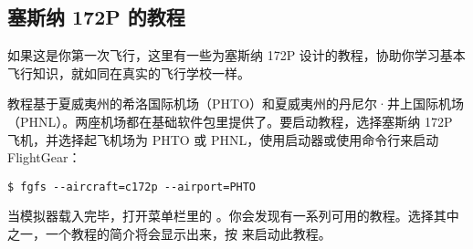 \ifchinese
\subsection{塞斯纳 172P 的教程}

如果这是你第一次飞行，这里有一些为塞斯纳 172P 设计的教程，协助你学习基本飞行知识，就如同在真实的飞行学校一样。

教程基于夏威夷州的希洛国际机场（PHTO）和夏威夷州的丹尼尔·井上国际机场（PHNL）。两座机场都在基础软件包里提供了。要启动教程，选择塞斯纳 172P 飞机，并选择起飞机场为 PHTO 或 PHNL，使用启动器或使用命令行来启动 FlightGear：
\fi
\iffalse
\IfLanguageName{english}{
\subsection{Cessna 172P tutorials}

If this is your first time flying, a number of tutorials exist for the
Cessna 172P designed to teach you the basics of flight, in a similar way to a
real flight school. The tutorials are based around Half-Moon Bay (KHAF) and
Livermore Municipal (KLVK) airports near San Francisco. Both these airports are
provided in the base package. To start the tutorials, select the Cessna 172P
aircraft, and a starting airport of KHAF or KLVK, using the wizard, or the
command line:
}{}
\fi


\begin{verbatim}
$ fgfs --aircraft=c172p --airport=PHTO
\end{verbatim}

\ifchinese
当模拟器载入完毕，打开菜单栏里的 。你会发现有一系列可用的教程。选择其中之一，一个教程的简介将会显示出来，按  来启动此教程。
\fi
\iffalse
\IfLanguageName{english}{
When the simulator has loaded, select Start Tutorial from the Help menu. You
will then be presented with a list of the tutorials available. Select a tutorial
and press Next. A description of the tutorial is displayed. Press Start
 to start the tutorial.
}{}
\fi

